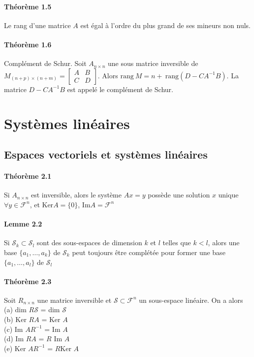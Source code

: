 \paragraph{Théorème 1.5}
Le rang d'une matrice $A$ est égal à l'ordre du plus grand de ses mineurs non nuls.

\paragraph{Théorème 1.6}
Complément de Schur. Soit $A_{n\times n}$ une sous matrice inversible de $M_{(n+p)\times (n+m)} = \begin{bmatrix}
A & B \\
C & D
\end{bmatrix}$. Alors $\text{rang} \ M = n + \ \text{rang}(D-CA^{-1}B)$. La matrice $D-CA^{-1}B$ est appelé le complément de Schur.

\section{Systèmes linéaires}
\subsection{Espaces vectoriels et systèmes linéaires}
\paragraph{Théorème 2.1} Si $A_{n\times n}$ est inversible, alors le système $Ax = y$ possède une solution $x$ unique $\forall y \in \mathcal{F}^n$, et $\text{Ker} A = \{0\}$, $\text{Im} A = \mathcal{F}^n$

\paragraph{Lemme 2.2} Si $\mathcal{S}_k \subset \mathcal{S}_l$ sont des sous-espaces de dimension $k$ et $l$ telles que $k < l$, alors une base $\{a_1,\dots,a_k\}$ de $\mathcal{S}_k$ peut toujours être complétée pour former une base $\{a_1,\dots,a_l\}$ de $\mathcal{S}_l$

\paragraph{Théorème 2.3} Soit $R_{n\times n}$ une matrice inversible et $\mathcal{S} \subset \mathcal{F}^n$ un sous-espace linéaire. On a alors \\
(a) dim $R\mathcal{S}$ = dim $\mathcal{S}$\\
(b) Ker $RA$ = Ker $A$\\
(c) Im $AR^{-1}$ = Im $A$\\
(d) Im $RA$ = $R$ Im $A$\\
(e) Ker $AR^{-1}$ = $R$Ker $A$

